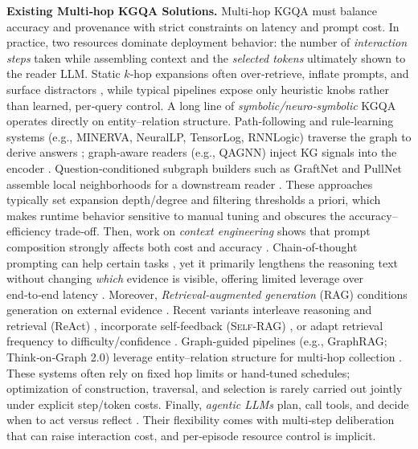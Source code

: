 \documentclass{article} %
\begin{document}
\textbf{Existing Multi‑hop KGQA Solutions.} Multi‑hop KGQA must balance accuracy and provenance with strict constraints on latency and prompt cost. In practice, two resources dominate deployment behavior: the number of \emph{interaction steps} taken while assembling context and the \emph{selected tokens} ultimately shown to the reader LLM. Static $k$‑hop expansions often over‑retrieve, inflate prompts, and surface distractors \citep{zhou2024efficient,wan2023efficientllms,jiang2019adversarialhotpot}, while typical pipelines expose only heuristic knobs rather than learned, per‑query control. A long line of \emph{symbolic/neuro‑symbolic} KGQA operates directly on entity–relation structure. Path‑following and rule‑learning systems (e.g., MINERVA, NeuralLP, TensorLog, RNNLogic) traverse the graph to derive answers \citep{das2018minerva,yang2017neurallp,cohen2016tensorlog,qu2021rnnlogic}; graph‑aware readers (e.g., QAGNN) inject KG signals into the encoder \citep{yasunaga2021qagnn}. Question‑conditioned subgraph builders such as GraftNet and PullNet assemble local neighborhoods for a downstream reader \citep{sun2019pullnet}. These approaches typically set expansion depth/degree and filtering thresholds a priori, which makes runtime behavior sensitive to manual tuning and obscures the accuracy–efficiency trade‑off. Then, work on \emph{context engineering} shows that prompt composition strongly affects both cost and accuracy \citep{zhou2024efficient,wan2023efficientllms}. Chain‑of‑thought prompting can help certain tasks \citep{wei2022cot,kojima2022zeroshot,han2026readbeforeyouthink}, yet it primarily lengthens the reasoning text without changing \emph{which} evidence is visible, offering limited leverage over end‑to‑end latency \citep{zhou2024efficient}. Moreover, \emph{Retrieval‑augmented generation} (RAG) conditions generation on external evidence \citep{lewis2020rag,karpukhin2020dense,izacard2022atlas}. Recent variants interleave reasoning and retrieval (ReAct) \citep{yao2023react}, incorporate self‑feedback (\textsc{Self‑RAG}) \citep{asai2023selfrag}, or adapt retrieval frequency to difficulty/confidence \citep{jeong2024adaptiverag,zhang2024retrievalqa}. Graph‑guided pipelines (e.g., GraphRAG; Think‑on‑Graph 2.0) leverage entity–relation structure for multi‑hop collection \citep{edge2024graphrag,ma2024tog2}. These systems often rely on fixed hop limits or hand‑tuned schedules; optimization of construction, traversal, and selection is rarely carried out jointly under explicit step/token costs. Finally, \emph{agentic LLMs} plan, call tools, and decide when to act versus reflect \citep{press2022selfask,yao2023react,shinn2023reflexion,schick2023toolformer,shen2023hugginggpt,liu2023agentbench,wang2023voyager}. Their flexibility comes with multi‑step deliberation that can raise interaction cost, and per‑episode resource control is  implicit.
\end{document}
